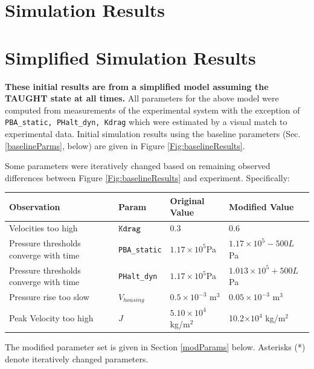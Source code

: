 \documentclass[letterpaper]{article}
\begin{document}
\section{Simulation Results}



\section{Simplified Simulation Results}
{\bf These initial results are from a simplified model assuming the TAUGHT state at all times. }
All parameters for the above model were computed from measurements of the experimental
system with the exception of {\tt PBA\_static, PHalt\_dyn, Kdrag} which were estimated
by a visual match to experimental data.
Initial simulation results using the baseline parameters (Sec. \ref{baselineParms}, below) are
given in Figure \ref{Fig:baselineResults}.

Some parameters were iteratively changed based on remaining observed differences
between Figure \ref{Fig:baselineResults} and experiment. Specifically:

\vspace{0.175in}
\begin{tabular}{p{1.5in}|l|l|l}
Observation       & Param    & Original Value & Modified Value      \\\hline
Velocities too high  & ${\tt Kdrag}$  &   0.3     & 0.6          \\\hline
Pressure thresholds converge with time& {\tt PBA\_static} & $1.17\times10^5 $Pa & $1.17\times10^5 - 500L$ Pa          \\\hline
Pressure thresholds converge with time & {\tt PHalt\_dyn} & $1.17\times10^5 $Pa & $1.013\times10^5 + 500L$ Pa       \\\hline
Pressure rise too slow  & $V_{housing}$   &  $0.5\times10^{-3}$ m$^3$   & $0.05\times10^{-3} $ m$^3$   \\\hline
Peak Velocity too high  & $J$             &  $5.10\times10^4$  kg/m$^2$     & 10.2$\times10^4$  kg/m$^2$ \\\hline
\end{tabular}

\vspace{0.175in}

The modified parameter set is given in Section \ref{modParams} below.  Asterisks (*) denote iteratively changed parameters.
\end{document}
